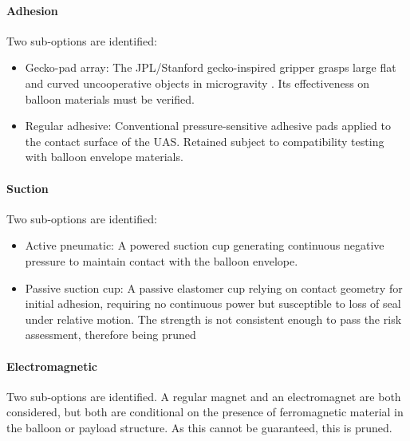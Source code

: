 \paragraph{Adhesion}

Two sub-options are identified:
\vspace{-10pt}

\begin{itemize}[leftmargin=*]

    \item Gecko-pad array: The JPL/Stanford gecko-inspired gripper grasps large flat and curved uncooperative objects in microgravity \cite{Jiang2017AMicrogravity}. Its effectiveness on balloon materials must be verified.

    \item Regular adhesive: Conventional pressure-sensitive adhesive pads applied to the contact surface of the UAS. Retained subject to compatibility testing with balloon envelope materials.

\end{itemize}
\vspace{-10pt}
\paragraph{Suction}
Two sub-options are identified:
\vspace{-10pt}

\begin{itemize}[leftmargin=*]

    \item Active pneumatic: A powered suction cup generating continuous negative pressure to maintain contact with the balloon envelope.

    \item Passive suction cup: A passive elastomer cup relying on contact geometry for initial adhesion, requiring no continuous power but susceptible to loss of seal under relative motion. The strength is not consistent enough to pass the risk assessment, therefore being pruned

\end{itemize}
\vspace{-15pt}
\paragraph{Electromagnetic}
Two sub-options are identified. A regular magnet and an electromagnet are both considered, but both are conditional on the presence of ferromagnetic material in the balloon or payload structure. As this cannot be guaranteed, this is pruned.
\vspace{-10pt}
